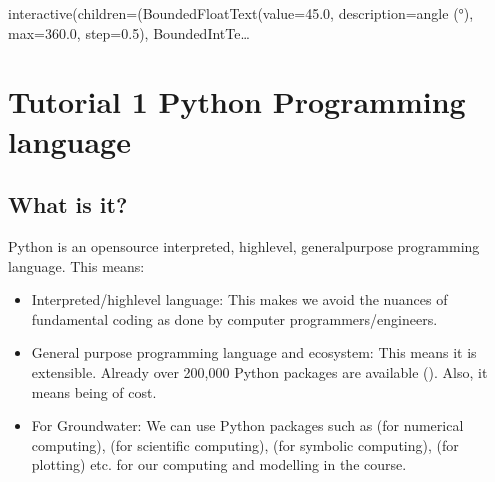 \documentclass[letterpaper,10pt,english]{sphinxmanual}
\begin{document}
\begin{sphinxVerbatim}[commandchars=\\\{\}]
interactive(children=(BoundedFloatText(value=45.0, description=\PYGZsq{}angle (°)\PYGZsq{}, max=360.0, step=0.5), BoundedIntTe…
\end{sphinxVerbatim}


\section{Tutorial 1 \sphinxhyphen{} Python Programming language}
\label{\detokenize{contents/tutorials/tutorial_01/01_python:tutorial-1-python-programming-language}}\label{\detokenize{contents/tutorials/tutorial_01/01_python::doc}}


\subsection{What is it?}
\label{\detokenize{contents/tutorials/tutorial_01/01_python:what-is-it}}
Python is an open\sphinxhyphen{}source interpreted, high\sphinxhyphen{}level, general\sphinxhyphen{}purpose programming language. This means:
\begin{itemize}
\item {} 
Interpreted/high\sphinxhyphen{}level language: This makes we avoid the nuances of fundamental coding as done by computer programmers/engineers.

\item {} 
General purpose programming language and  ecosystem: This means it is extensible. Already over 200,000 Python packages are available (). Also, it means being  of cost.

\item {} 
For Groundwater: We can use Python packages such as  (for numerical computing),  (for scientific computing),  (for symbolic computing),  (for plotting) etc. for our computing and modelling in the course.

\end{itemize}
\end{document}
